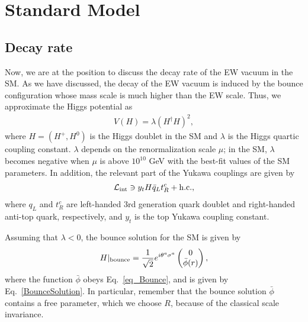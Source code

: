 \documentclass[12pt]{article}
\begin{document}
\section{Standard Model}
\label{sec_SM}
\setcounter{equation}{0}

\subsection{Decay rate}

Now, we are at the position to discuss the decay rate of the EW vacuum
in the SM.  As we have discussed, the decay of the EW vacuum is
induced by the bounce configuration whose mass scale is much higher
than the EW scale.  Thus, we approximate the Higgs potential as
\begin{align}
  V(H) = \lambda(H^\dagger H)^2,
  \label{V(Phi)}
\end{align}
where $H= (H^+,H^0)$ is the Higgs doublet in the SM and $\lambda$ is
the Higgs quartic coupling constant.  $\lambda$ depends on the
renormalization scale $\mu$; in the SM, $\lambda$ becomes negative
when $\mu$ is above $10^{10}$ GeV with the best-fit values of the SM
parameters.  In addition, the relevant part of the Yukawa couplings
are given by
\begin{align}
  \mathcal L_{\rm int} \ni
  y_t H \bar{q}_L t_R^{c} + {\rm h.c.},
\end{align}
where $q_L$ and $t_R^c$ are left-handed 3rd generation quark doublet
and right-handed anti-top quark, respectively, and $y_t$ is the top
Yukawa coupling constant.

Assuming that $\lambda<0$, the bounce solution for the SM is given by
\begin{align}
  H|_{\rm bounce} = \frac{1}{\sqrt{2}} e^{i\theta^a \sigma^a}
  \begin{pmatrix}
    0 \\
    \bar\phi(r)
  \end{pmatrix},
\end{align}
where the function $\bar\phi$ obeys Eq.\ \eqref{eq_Bounce}, and is
given by Eq.\ \eqref{BounceSolution}.  In particular, remember that the
bounce solution $\bar\phi$ contains a free parameter, which we choose
$R$, because of the classical scale invariance.
\end{document}
